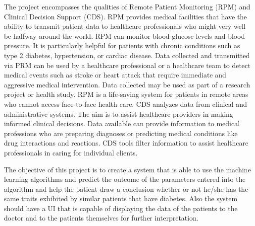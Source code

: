 \documentclass[12pt]{article}
\begin{document}
The project encompasses the qualities of Remote Patient Monitoring (RPM) and Clinical Decision Support (CDS). RPM provides medical facilities that have the ability to transmit patient data to healthcare professionals who might very well be halfway around the world. RPM can monitor blood glucose levels and blood pressure. It is particularly helpful for patients with chronic conditions such as type 2 diabetes, hypertension, or cardiac disease. Data collected and transmitted via PRM can be used by a healthcare professional or a healthcare team to detect medical events such as stroke or heart attack that require immediate and aggressive medical intervention. Data collected may be used as part of a research project or health study. RPM is a life-saving system for patients in remote areas who cannot access face-to-face health care. CDS analyzes data from clinical and administrative systems. The aim is to assist healthcare providers in making informed clinical decisions. Data available can provide information to medical professions who are preparing diagnoses or predicting medical conditions like drug interactions and reactions. CDS tools filter information to assist healthcare professionals in caring for individual clients. 

The objective of this project is to create a  system that is able to use the machine learning algorithms and predict the outcome of the parameters entered into the algorithm and help the patient draw a conclusion whether or not he/she has the same traits exhibited by similar patients that have diabetes. Also the system should have a UI that is capable of displaying the data of the patients to the doctor and to the patients themselves for further interpretation.

\newpage
\end{document}
